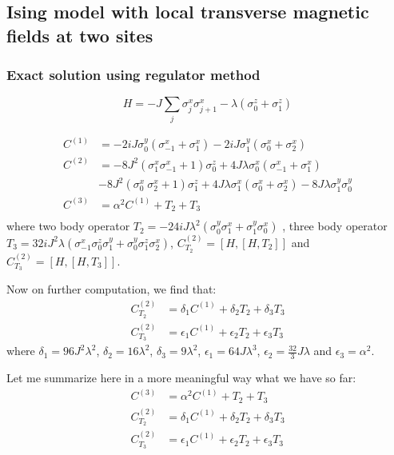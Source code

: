 \documentclass[11pt,a4paper]{article}
\begin{document}
\subsection{Ising model with local transverse magnetic fields at two sites}

\subsubsection{Exact solution using regulator method}

\begin{equation}
H= -J \sum_{j}  \sigma_j^x \sigma_{j+1}^x -  \lambda  (\sigma_0^z+ \sigma_1^z) 
\label{xx2}
\end{equation}

\begin{align*}
C^{(1)}&= -2 i J \sigma_0^y ( \sigma_{-1}^x + \sigma_1^x)  -2 i J \sigma_1^y ( \sigma_{0}^x + \sigma_2^x) \\ 
C^{(2)}&= - 8 J^2(\sigma^x_1 \sigma^x_{-1} +1) \sigma^z_0 + 4J \lambda \sigma_0^x( \sigma_{-1}^x + \sigma_1^x) \\
& - 8 J^2(\sigma^x_0 \ \sigma^x_{2}+1)  \sigma^z_1 + 4J \lambda \sigma_1^x( \sigma_{0}^x + \sigma_2^x)- 8 J \lambda \sigma_1^y \sigma_0^y\\
C^{(3)} &=   \alpha^2  C^{(1)}  +T_2  +T_3\\  %
\end{align*}
where two body operator $T_2=-24 i J \lambda^2 (\sigma^y_{0} \sigma^x_1+ \sigma^y_{1} \sigma^x_0)$  , three body operator $T_3= 32i J^2 \lambda (\sigma^x_{-1} \sigma^z_0 \sigma^y_1   + \sigma^y_{0} \sigma^z_1 \sigma^x_2)$, $C^{(2)}_{T_2}=[H, [H, T_2]]$ and  $C^{(2)}_{T_3}=[H, [H, T_3]]$.


Now on further computation, we find that:
\begin{align}
C^{(2)}_{T_2}&= \delta_1 C^{(1)} + \delta_2 T_2 + \delta_3 T_3 \\
C^{(2)}_{T_3}&= \epsilon_1 C^{(1)} + \epsilon_2 T_2 + \epsilon_3 T_3 
\end{align}
where $\delta_1= 96 J^2 \lambda^2$, $\delta_2= 16 \lambda^2$, $\delta_3= 9 \lambda^2$, $\epsilon_1= 64 J \lambda^3$, $\epsilon_2= \frac{32}{3} J \lambda$ and $\epsilon_3= \alpha^2$.



Let me summarize here in a more meaningful way what we have so far:
\begin{equation}
\begin{aligned}
C^{(3)} &=   \alpha^2  C^{(1)}  +T_2  +T_3\\
C^{(2)}_{T_2}&= \delta_1 C^{(1)} + \delta_2 T_2 + \delta_3 T_3 \\
C^{(2)}_{T_3}&= \epsilon_1 C^{(1)} + \epsilon_2 T_2 + \epsilon_3 T_3 
\end{aligned}
\end{equation}
\end{document}

